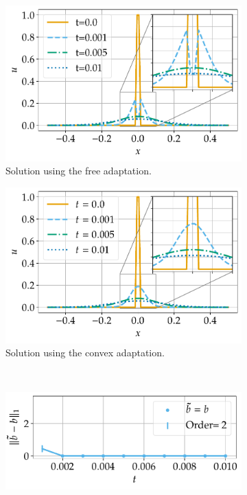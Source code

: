 \documentclass[a4paper]{article}
\numberwithin{equation}{section}
\theoremstyle{plain}
\theoremstyle{definition}
\numberwithin{theorem}{section}
\newcommand{\1}{\mathbbm{1}}
\begin{document}
\begin{figure}
\centering
\begin{subfigure}[b]{0.45\textwidth}
\centering
\includegraphics[width=1\textwidth]{plots/Diff_Direct.pdf}
\caption{Solution using the free adaptation.}
\label{fig:sol_Diff_a}
\end{subfigure}
\begin{subfigure}[b]{0.45\textwidth}
\centering
\includegraphics[width=1\textwidth]{plots/Diff_Convex.pdf}
\caption{Solution using the convex adaptation.}
\label{fig:sol_Diff_c}
\end{subfigure}
\\
\begin{subfigure}[b]{0.45\textwidth}
\centering
\includegraphics[width=1\textwidth]{plots/b_Diff_Direct.pdf}

\end{subfigure}
\end{figure}
\end{document}
